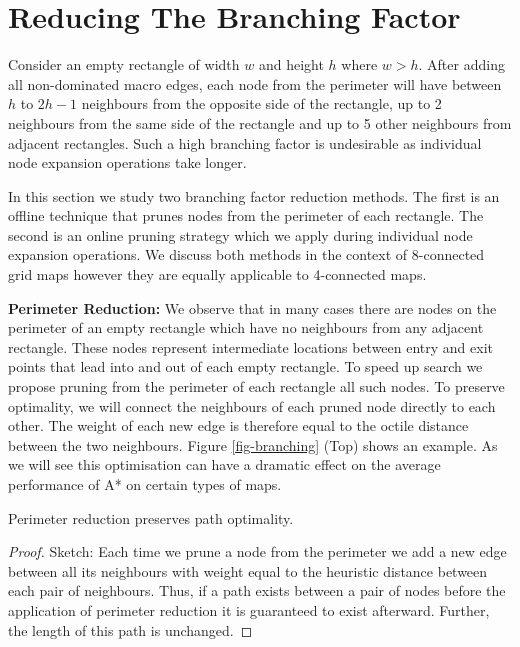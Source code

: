 \section{Reducing The Branching Factor}
Consider an empty rectangle of width $w$ and height $h$ where $w > h$.  After
adding all non-dominated macro edges, each node from the perimeter will have
between $h$ to $2h-1$ neighbours from the opposite side of the rectangle, up to
2 neighbours from the same side of the rectangle and up to 5 other neighbours
from adjacent rectangles.  Such a high branching factor is undesirable as
individual node expansion operations take longer.

In this section we study two branching factor reduction methods.  The first is
an offline technique that prunes nodes from the perimeter of each rectangle.
The second is an online pruning strategy which we apply during individual node
expansion operations.  We discuss both methods in the context of 8-connected
grid maps however they are equally applicable to 4-connected maps.

\noindent
\textbf{Perimeter Reduction:}
We observe that in many cases there are nodes on the perimeter of an empty
rectangle which have no neighbours from any adjacent rectangle.  These nodes
represent intermediate locations between entry and exit points that lead into
and out of each empty rectangle.  To speed up search we propose pruning from the
perimeter of each rectangle all such nodes.  To preserve optimality, we will
connect the neighbours of each pruned node directly to each other.  The weight
of each new edge is therefore equal to the octile distance between the two
neighbours.  Figure \ref{fig-branching} (Top) shows an example.  As we will see
this optimisation can have a dramatic effect on the average performance of A* on
certain types of maps.

\begin{lemma}
Perimeter reduction preserves path optimality.
\end{lemma}
\begin{proof}
Sketch: Each time we prune a node from the perimeter we add a new edge between
all its neighbours with weight equal to the heuristic distance between each pair
of neighbours.  Thus, if a path exists between a pair of nodes before the
application of perimeter reduction it is guaranteed to exist afterward.
Further, the length of this path is unchanged.
\end{proof}


